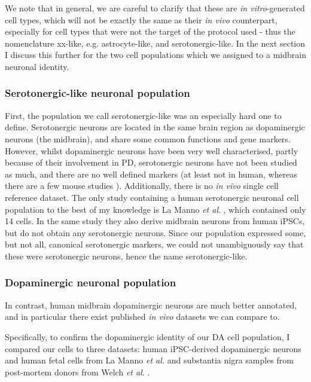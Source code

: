 We note that in general, we are careful to clarify that these are \textit{in vitro}-generated cell types, which will not be exactly the same as their \textit{in vivo} counterpart, especially for cell types that were not the target of the protocol used - thus the nomenclature xx-like, e.g. astrocyte-like, and serotonergic-like.
In the next section I discuss this further for the two cell populations which we assigned to a midbrain neuronal identity.

\subsubsection{Serotonergic-like neuronal population}

First, the population we call serotonergic-like was an especially hard one to define.
Serotonergic neurons are located in the same brain region as dopaminergic neurons 
(the midbrain), and share some common functions and gene markers.
However, whilst dopaminergic neurons have been very well characterised, partly because of their involvement in PD, serotonergic neurons have not been studied as much, and there are no well defined markers (at least not in human, whereas there are a few mouse studies \cite{cummings2019serotonergic}).
Additionally, there is no \textit{in vivo} single cell reference dataset.
The only study containing a human serotonergic neuronal cell population to the best of my knowledge is La Manno \textit{et al}. \cite{la2016molecular}, which contained only 14 cells.
In the same study they also derive midbrain neurons from human iPSCs, but do not obtain any serotonergic neurons.
Since our population expressed some, but not all, canonical serotonergic markers, we could not unambiguously say that these were serotonergic neurons, hence the name serotonergic-like.

\subsubsection{Dopaminergic neuronal population}

In contrast, human midbrain dopaminergic neurons are much better annotated, and in particular there exist published \textit{in vivo} datasets we can compare to.

Specifically, to confirm the dopaminergic identity of our DA cell population, I compared our cells to three datasets: human iPSC-derived dopaminergic neurons and human fetal cells from La Manno \textit{et al.} \cite{la2016molecular} and substantia nigra samples from post-mortem donors from Welch \textit{et al}. \cite{welch2019single}. \\

